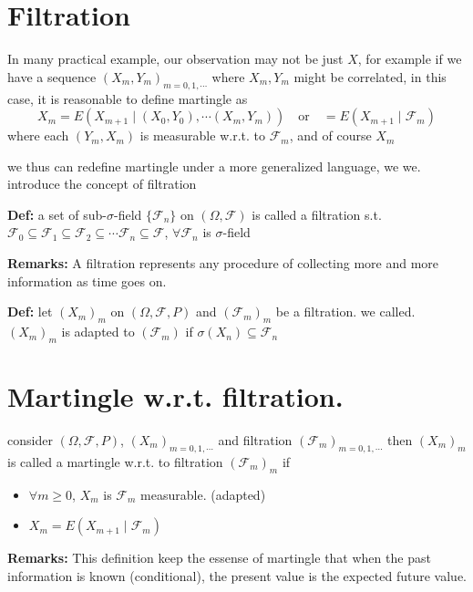 \documentclass[
  letterpaper,
  DIV=11,
  numbers=noendperiod]{scrreprt}
\providecommand{\tightlist}{%
  \setlength{\itemsep}{0pt}\setlength{\parskip}{0pt}}
\theoremstyle{definition}
\theoremstyle{plain}
\theoremstyle{plain}
\theoremstyle{definition}
\theoremstyle{plain}
\theoremstyle{plain}
\theoremstyle{remark}
\begin{document}
\section{Filtration}\label{filtration}

In many practical example, our observation may not be just \(X\), for
example if we have a sequence \((X_m, Y_m)_{m=0,1,\cdots}\) where
\(X_m, Y_m\) might be correlated, in this case, it is reasonable to
define martingle as \[
X_m = E(X_{m+1} \mid (X_0, Y_0), \cdots (X_m, Y_m)) \quad \text{or} \quad = E(X_{m+1} \mid \mathcal{F}_m)
\] where each \((Y_m, X_m)\) is measurable w.r.t. to \(\mathcal{F}_m\),
and of course \(X_m\)

we thus can redefine martingle under a more generalized language, we we.
introduce the concept of filtration

\textbf{Def:} a set of sub-\(\sigma\)-field \(\{\mathcal{F}_n\}\) on
\((\Omega, \mathcal{F})\) is called a filtration s.t.
\(\mathcal{F}_0 \subseteq \mathcal{F}_1 \subseteq \mathcal{F}_2 \subseteq \cdots \mathcal{F}_n \subseteq \mathcal{F}\),
\(\forall \mathcal{F}_n\) is \(\sigma\)-field

\textbf{Remarks:} A filtration represents any procedure of collecting
more and more information as time goes on.

\textbf{Def:} let \((X_m)_m\) on \((\Omega, \mathcal{F}, P)\) and
\((\mathcal{F}_m)_m\) be a filtration. we called. \((X_m)_m\) is adapted
to \((\mathcal{F}_m)\) if \(\sigma(X_n) \subseteq \mathcal{F}_n\)

\section{Martingle w.r.t.
filtration.}\label{martingle-w.r.t.-filtration.}

consider \((\Omega, \mathcal{F}, P)\), \((X_m)_{m=0,1,\cdots}\) and
filtration \((\mathcal{F}_m)_{m=0,1,\cdots}\) then \((X_m)_m\) is called
a martingle w.r.t. to filtration \((\mathcal{F}_m)_m\) if

\begin{itemize}
\tightlist
\item
  \(\forall m \geq 0\), \(X_m\) is \(\mathcal{F}_m\) measurable.
  (adapted)
\item
  \(X_m = E(X_{m+1} \mid \mathcal{F}_m)\)
\end{itemize}

\textbf{Remarks:} This definition keep the essense of martingle that
when the past information is known (conditional), the present value is
the expected future value.
\end{document}
